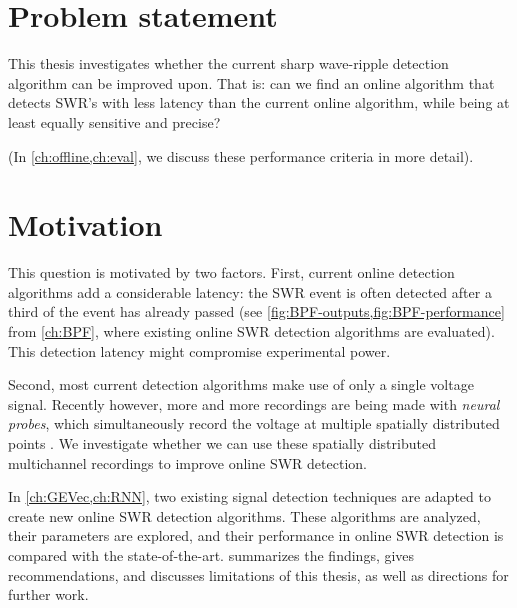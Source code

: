 \section{Problem statement}
\label{sec:problem}

This thesis investigates whether the current sharp wave-ripple detection algorithm can be improved upon. That is: can we find an online algorithm that detects SWR's with less latency than the current online algorithm, while being at least equally sensitive and precise?

(In \cref{ch:offline,ch:eval}, we discuss these performance criteria in more detail).



\section{Motivation}
\label{sec:motivation}

This question is motivated by two factors. First, current online detection algorithms add a considerable latency: the SWR event is often detected after a third of the event has already passed (see \cref{fig:BPF-outputs,fig:BPF-performance} from \cref{ch:BPF}, where existing online SWR detection algorithms are evaluated). This detection latency might compromise experimental power.

Second, most current detection algorithms make use of only a single voltage signal. Recently however, more and more recordings are being made with \emph{neural probes}, which simultaneously record the voltage at multiple spatially distributed points \cite{Michon2016,Jun2017}. We investigate whether we can use these spatially distributed multichannel recordings to improve online SWR detection.

In \cref{ch:GEVec,ch:RNN}, two existing signal detection techniques are adapted to create new online SWR detection algorithms. These algorithms are analyzed, their parameters are explored, and their performance in online SWR detection is compared with the state-of-the-art.  summarizes the findings, gives recommendations, and discusses limitations of this thesis, as well as directions for further work.
